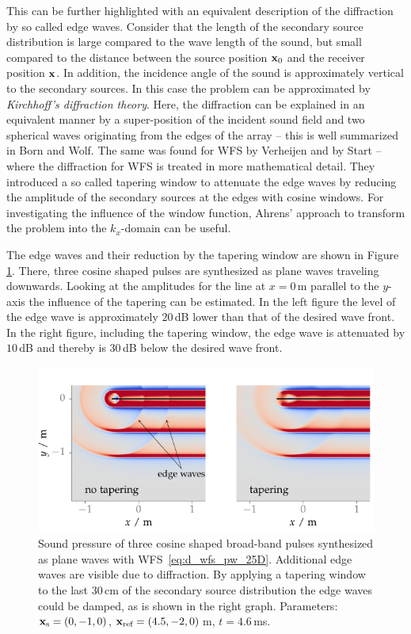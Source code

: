 This can be further highlighted with an
equivalent description of the diffraction by so called edge waves.
Consider that the length of the secondary source distribution is large
compared to the wave
length of the sound, but small compared to the distance between the
source position $\mathbf{x}_0$ and the receiver position $\mathbf{x}$. In addition,
the incidence angle of the sound is approximately
vertical to the secondary sources. In this case the problem can be approximated by
\emph{Kirchhoff's diffraction theory}.\autocite[][Sect.\,8.3.2.]{Born1999}
Here, the
diffraction can be explained in an equivalent manner
by a super-position of the incident
sound field and two spherical waves originating from the edges of the array --
this is well summarized in Born and Wolf.\autocite[][Sect.\,8.9]{Born1999}
\FloatBarrier%
The same was found for \ac{WFS} by Verheijen\autocite{Verheijen1997} and
by Start\autocite{Start1997} -- where the diffraction for \ac{WFS} is
treated in more mathematical detail.
They introduced a so called tapering window to
attenuate the edge waves by reducing the amplitude of the secondary sources at the
edges with cosine windows. For investigating the influence of the window
function, Ahrens' approach to transform the problem into the $k_x$-domain can be
useful.\autocite[][Sect.\,3.7.4]{Ahrens2012}

The edge waves and their reduction by the tapering window are shown in
Figure\,\ref{fig:tapering}. There, three cosine shaped pulses are synthesized as
plane waves traveling downwards. Looking at the amplitudes for the line at $x
= 0$\,m parallel to the $y$-axis the influence of the tapering can be estimated.
In the left figure the level of the edge wave is approximately $20$\,dB lower than
that of the
desired wave front. In the right figure, including the tapering window, the edge
wave is attenuated by $10$\,dB and thereby is $30$\,dB below the desired wave
front.
%
\begin{figure}
    \centering
    \includegraphics{fig3_04/fig3_04}
    \caption{Sound pressure of three cosine shaped broad-band pulses
    synthesized as plane waves with \ac{WFS}~\protect\eqref{eq:d_wfs_pw_25D}.
    Additional edge waves are visible due to diffraction.
    By applying a tapering window to the last $30$\,cm of the secondary source
    distribution the edge waves could be damped, as is shown in the
    right graph.
    Parameters: $\mathbf{x}_\text{s} =(0,-1,0)$, $\mathbf{x}_\text{ref} = (4.5,-2,0)$\,m, $t = 4.6$\,ms.
    }
    \label{fig:tapering}
\end{figure}
%

